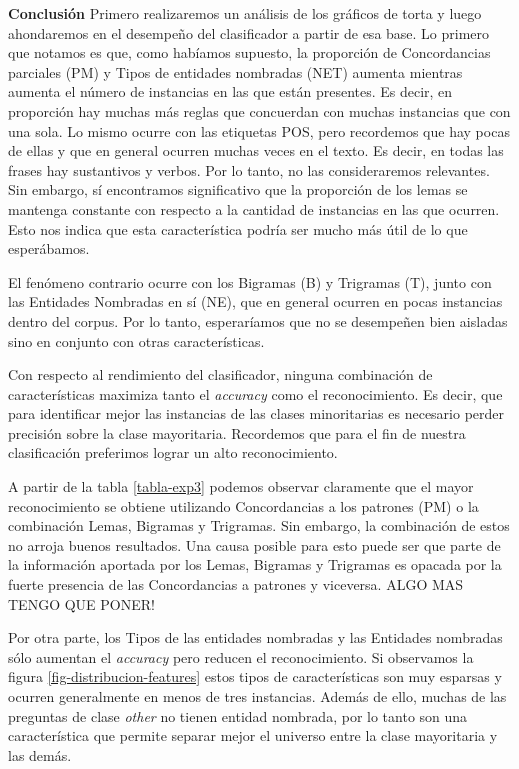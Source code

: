 \textbf{Conclusión} Primero realizaremos un análisis de los gráficos de torta y luego ahondaremos en el desempeño del clasificador a partir de esa base. Lo primero que notamos es que, como habíamos supuesto, la proporción de Concordancias parciales (PM) y Tipos de entidades nombradas (NET) aumenta mientras aumenta el número de instancias en las que están presentes. Es decir, en proporción hay muchas más reglas que concuerdan con muchas instancias que con una sola. Lo mismo ocurre con las etiquetas POS, pero recordemos que hay pocas de ellas y que en general ocurren muchas veces en el texto. Es decir, en todas las frases hay sustantivos y verbos. Por lo tanto, no las consideraremos relevantes. Sin embargo, sí encontramos significativo que la proporción de los lemas se mantenga constante con respecto a la cantidad de instancias en las que ocurren. Esto nos indica que esta característica podría ser mucho más útil de lo que esperábamos.

El fenómeno contrario ocurre con los Bigramas (B) y Trigramas (T), junto con las Entidades Nombradas en sí (NE), que en general ocurren en pocas instancias dentro del corpus. Por lo tanto, esperaríamos que no se desempeñen bien aisladas sino en conjunto con otras características.

Con respecto al rendimiento del clasificador, ninguna combinación de características maximiza tanto el \textit{accuracy} como el reconocimiento. Es decir, que para identificar mejor las instancias de las clases minoritarias es necesario perder precisión sobre la clase mayoritaria. Recordemos que para el fin de nuestra clasificación preferimos lograr un alto reconocimiento.

A partir de la tabla \ref{tabla-exp3} podemos observar claramente que el mayor reconocimiento se obtiene utilizando Concordancias a los patrones (PM) o la combinación Lemas, Bigramas y Trigramas. Sin embargo, la combinación de estos no arroja buenos resultados. Una causa posible para esto puede ser que parte de la información aportada por los Lemas, Bigramas y Trigramas es opacada por la fuerte presencia de las Concordancias a patrones y viceversa. ALGO MAS TENGO QUE PONER!

Por otra parte, los Tipos de las entidades nombradas y las Entidades nombradas sólo aumentan el \textit{accuracy} pero reducen el reconocimiento. Si observamos la figura \ref{fig-distribucion-features} estos tipos de características son muy esparsas y ocurren generalmente en menos de tres instancias. Además de ello, muchas de las preguntas de clase \textit{other} no tienen entidad nombrada, por lo tanto son una característica que permite separar mejor el universo entre la clase mayoritaria y las demás.

